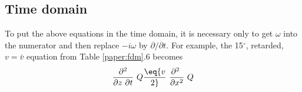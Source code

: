 {%
\subsection{Time domain}
\par
To put the above equations in the time domain, it is necessary only to
get  $ \omega $  into the numerator and
then replace  $ -i \omega $  by  $ \partial / \partial t $.
For example, the 15$^\circ$,  retarded, $ v  =  \bar v $  equation
from Table \ref{paper:fdm}.6 becomes
\begin{equation}
{ \partial^2   \over  \partial z \  \partial t } \  Q  \eq
{v \over 2 }\  { \partial^2 \    \over  \partial x^2 } \  Q
\label{eqn:one14}
\end{equation}
}
